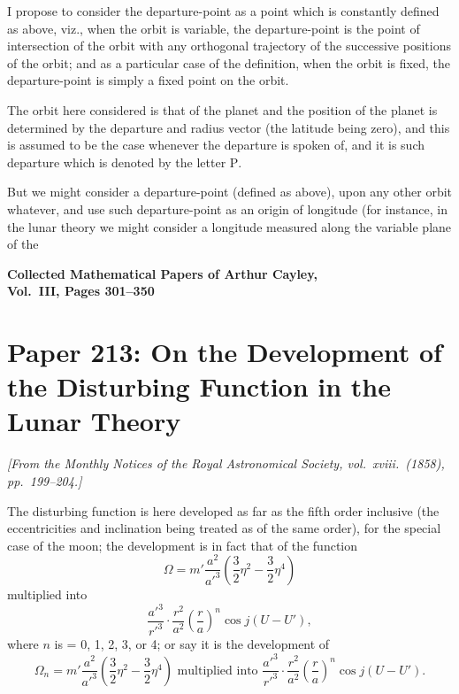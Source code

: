 \documentclass[11pt,a4paper]{book}
\begin{document}
I propose to consider the departure-point as a point which is constantly defined as above, viz., when the orbit is variable, the departure-point is the point of intersection of the orbit with any orthogonal trajectory of the successive positions of the orbit; and as a particular case of the definition, when the orbit is fixed, the departure-point is simply a fixed point on the orbit.

The orbit here considered is that of the planet and the position of the planet is determined by the departure and radius vector (the latitude being zero), and this is assumed to be the case whenever the departure is spoken of, and it is such departure which is denoted by the letter $\mathrm{P}$.

But we might consider a departure-point (defined as above), upon any other orbit whatever, and use such departure-point as an origin of longitude (for instance, in the lunar theory we might consider a longitude measured along the variable plane of the
\clearpage


\begin{center}
\Large\textbf{Collected Mathematical Papers of Arthur Cayley,\\Vol.~III, Pages 301--350}
\end{center}


\newpage

\section{Paper 213: On the Development of the Disturbing Function in the Lunar Theory}
\label{sec:paper213}

\noindent\textit{[From the \textit{Monthly Notices of the Royal Astronomical Society}, vol.~xviii.~(1858), pp.~199--204.]}

\medskip\noindent
The disturbing function is here developed as far as the fifth order inclusive (the eccentricities and inclination being treated as of the same order), for the special case of the moon; the development is in fact that of the function
\[
\Omega = m' \frac{a^2}{a'^3} \left(\frac{3}{2}\eta^2 - \frac{3}{2}\eta^4\right)
\]
multiplied into
\[
\frac{a'^3}{r'^3} \cdot \frac{r^2}{a^2} \left(\frac{r}{a}\right)^n \cos j(U - U'),
\]
where $n$ is = 0, 1, 2, 3, or 4; or say it is the development of
\[
\Omega_n = m' \frac{a^2}{a'^3} \left(\frac{3}{2}\eta^2 - \frac{3}{2}\eta^4\right) \text{ multiplied into } \frac{a'^3}{r'^3} \cdot \frac{r^2}{a^2} \left(\frac{r}{a}\right)^n \cos j(U - U').
\]
\end{document}
